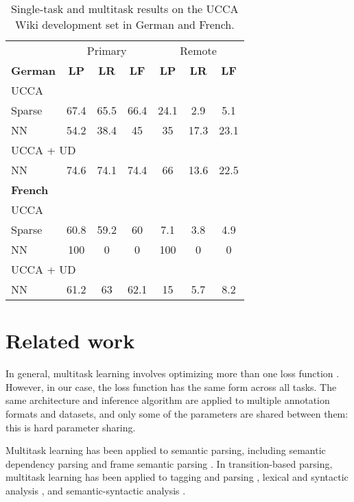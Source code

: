 \documentclass[11pt,a4paper]{article}
\begin{document}
\begin{table}
\begin{tabular}{lccc|ccc}
& \multicolumn{3}{c|}{Primary} & \multicolumn{3}{c}{Remote} \\
\textbf{German} & \textbf{LP} & \textbf{LR} & \textbf{LF} & \textbf{LP} & \textbf{LR} & \textbf{LF} \\
UCCA \\
\small Sparse & 67.4 & 65.5 & 66.4 & 24.1 & 2.9 & 5.1 \\
\small NN & 54.2 & 38.4 & 45 & 35 & 17.3 & 23.1 \\
\multicolumn{3}{l}{UCCA + UD} \\
\small NN & 74.6 & 74.1 & 74.4 & 66 & 13.6 & 22.5 \\
\hline
\textbf{French} \\
UCCA \\
\small Sparse & 60.8 & 59.2 & 60 & 7.1 & 3.8 & 4.9 \\
\small NN & 100 & 0 & 0 & 100 & 0 & 0 \\
\multicolumn{3}{l}{UCCA + UD} \\
\small NN & 61.2 & 63 & 62.1 & 15 & 5.7 & 8.2
\end{tabular}
\caption{Single-task and multitask results on the UCCA Wiki development set in German and French.\label{tab:other_languages}}
\end{table}



\section{Related work}\label{sec:related_work}

In general, multitask learning involves optimizing more than one loss function \cite{ruder2017overview}.
However, in our case, the loss function has the same form across all tasks.
The same architecture and inference algorithm are applied to multiple annotation formats and datasets,
and only some of the parameters are shared between them: this is hard parameter sharing.

Multitask learning has been applied to semantic parsing, including
semantic dependency parsing \cite{P17-1186} and
frame semantic parsing \cite{swayamdipta2017frame}.
In transition-based parsing, multitask learning has been applied to
tagging and parsing \cite{bohnet2012transition,Zhang2016StackpropagationIR},
lexical and syntactic analysis \cite{constant-nivre:2016:P16-1,more2016joint},
and semantic-syntactic analysis \cite{swayamdipta-EtAl:2016:CoNLL,henderson2013multilingual}.
\end{document}
